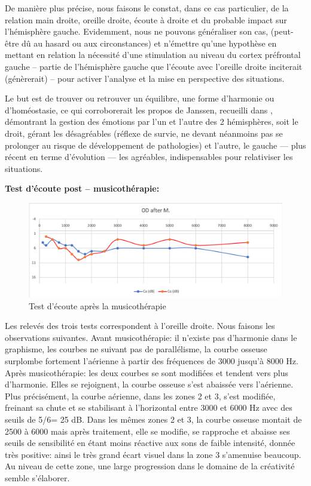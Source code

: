 De manière plus précise, nous faisons le constat, dans ce cas
particulier,  de la relation main droite, oreille droite, écoute
à droite et du probable impact sur l'hémisphère gauche.
Evidemment, nous ne pouvons généraliser son cas, (peut-être dû au hasard ou aux circonstances) et 
n'émettre qu'une hypothèse
en mettant en relation la nécessité d'une stimulation au niveau du cortex préfrontal
gauche -- partie de l'hémisphère gauche que l'écoute avec
l'oreille droite inciterait (génèrerait) -- pour activer l'analyse et la
mise en perspective des situations.

Le but est de trouver ou
retrouver un équilibre, une forme d'harmonie ou d'homéostasie, ce qui corroborerait les
propos de Janssen, recueilli dans  \autocite {van_eersel_votre_2012 }, démontrant la gestion des 
émotions par
l'un et l'autre des 2 hémisphères, soit le droit,  gérant les désagréables
(réflexe de survie, ne devant néanmoins pas se prolonger au risque de
développement de pathologies)
et l'autre, le gauche --- plus récent en terme d'évolution ---  les
agréables, indispensables pour relativiser les situations.

\textbf{ Test d'écoute post -- musicothérapie:}



\begin{figure}[h]
	\centering
	
	\includegraphics[width=1\linewidth]{images/clinique/od_after_m.png}
	\caption{Test d'écoute après la musicothérapie}
	\label{fig:odaftermeyer}
\end{figure}
Les relevés des trois tests correspondent à l'oreille droite.
Nous faisons les observations suivantes.
Avant musicothérapie: il n'existe pas d'harmonie dans le graphisme, les courbes ne suivant pas de 
parallélisme, la courbe osseuse  surplombe fortement l'aérienne 
à partir des fréquences de 3000 jusqu'à 8000 Hz.
Après musicothérapie:  les deux courbes se sont modifiées et tendent vers plus d'harmonie.
Elles se rejoignent, la courbe osseuse s'est abaissée vers l'aérienne.
 Plus précisément, la courbe aérienne, dans les
zones 2 et 3,  s'est modifiée, freinant sa
chute et se stabilisant à l'horizontal entre 3000 et 6000 Hz
avec des seuils de 5/6= 25 dB.
Dans les mêmes zones 2 et 3, la
courbe osseuse montait de 2500 à 6000 mais après traitement,
elle se modifie, se rapproche et abaisse ses seuils de
sensibilité en étant moins réactive aux sons de faible
intensité, donnée très positive: ainsi le très grand écart visuel dans la zone 3 s'amenuise beaucoup. Au 
niveau de cette
zone, une large progression dans
le domaine de la créativité semble s'élaborer. 

